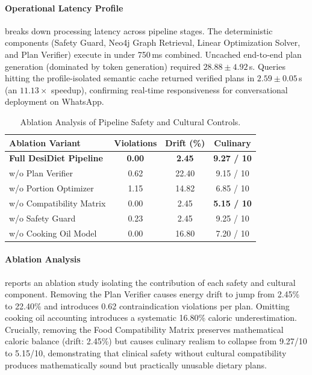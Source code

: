 \documentclass[5p,times,twocolumn]{elsarticle}
\makeatletter
\def\systemname{DesiDiet}%
\def\my@bx{bx}
\def\my@b{b}
\DeclareRobustCommand{\systemname}{%
  \texorpdfstring{%
    \ifx\f@series\my@bx
      DesiDiet%
    \else\ifx\f@series\my@b
      DesiDiet%
    \else
      \textsc{DesiDiet}%
    \fi\fi
  }{DesiDiet}%
}
\makeatother
\begin{document}
\paragraph{Operational Latency Profile}
 breaks down processing latency across pipeline stages. The deterministic components (Safety Guard, Neo4j Graph Retrieval, Linear Optimization Solver, and Plan Verifier) execute in under 750\,ms combined. Uncached end-to-end plan generation (dominated by token generation) required $28.88 \pm 4.92$\,s. Queries hitting the profile-isolated semantic cache returned verified plans in $2.59 \pm 0.05$\,s (an $11.13\times$ speedup), confirming real-time responsiveness for conversational deployment on WhatsApp.

\begin{table}[!htbp]
\centering
\caption{Ablation Analysis of Pipeline Safety and Cultural Controls.}
\label{tab:ablation}
\footnotesize
\begin{tabularx}{\columnwidth}{>{\raggedright\arraybackslash}Xccc}
\toprule
\textbf{Ablation Variant} & \textbf{Violations} & \textbf{Drift (\%)} & \textbf{Culinary} \\
\midrule
\textbf{Full \systemname{} Pipeline} & \textbf{0.00} & \textbf{2.45} & \textbf{9.27 / 10} \\
w/o Plan Verifier & 0.62 & 22.40 & 9.15 / 10 \\
w/o Portion Optimizer & 1.15 & 14.82 & 6.85 / 10 \\
w/o Compatibility Matrix & 0.00 & 2.45 & \textbf{5.15 / 10} \\
w/o Safety Guard & 0.23 & 2.45 & 9.25 / 10 \\
w/o Cooking Oil Model & 0.00 & 16.80 & 7.20 / 10 \\
\bottomrule
\end{tabularx}
\end{table}

\paragraph{Ablation Analysis}
 reports an ablation study isolating the contribution of each safety and cultural component. Removing the Plan Verifier causes energy drift to jump from 2.45\% to 22.40\% and introduces 0.62 contraindication violations per plan. Omitting cooking oil accounting introduces a systematic 16.80\% caloric underestimation. Crucially, removing the Food Compatibility Matrix preserves mathematical caloric balance (drift: 2.45\%) but causes culinary realism to collapse from 9.27/10 to 5.15/10, demonstrating that clinical safety without cultural compatibility produces mathematically sound but practically unusable dietary plans.
\end{document}
